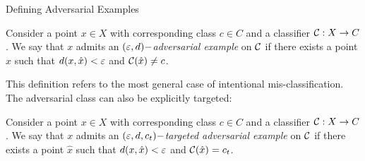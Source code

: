 
\begin{frame}{Defining Adversarial Examples}
    \begin{definition}
Consider a point $x \in X$ with corresponding class $c \in C$ and a classifier $\mathcal{C}: X \to C$. We say that $x$ admits an \emph{$(\varepsilon,d)-$adversarial example} on $\mathcal{C}$ if there exists a point $\hat x$ such that $d(x,\hat x) < \varepsilon$ and $\mathcal{C}(\hat x) \neq c$. 
\end{definition}
This definition refers to the most general case of intentional mis-classification. The adversarial class can also be explicitly targeted:
\begin{definition}
Consider a point $x \in X$ with corresponding class $c \in C$ and a classifier $\mathcal{C}: X \to C$. We say that $x$ admits an \emph{$(\varepsilon,d,c_t)-$targeted adversarial example} on $\mathcal{C}$ if there exists a point $\hat x$ such that $d(x,\hat x) < \varepsilon$ and $\mathcal{C}(\hat x) = c_t$. 
\end{definition}
\end{frame}




